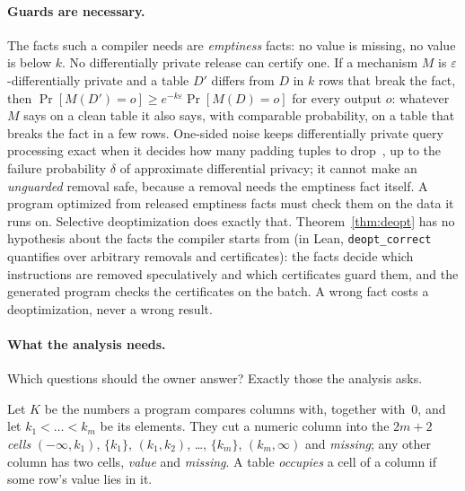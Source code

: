 \paragraph{Guards are necessary.} The facts such a compiler needs are \emph{emptiness} facts: no value
is missing, no value is below $k$. No differentially private release can certify one. If a mechanism
$M$ is $\varepsilon$-differentially private and a table $D'$ differs from $D$ in $k$ rows that break
the fact, then $\Pr[M(D') = o] \ge e^{-k\varepsilon}\Pr[M(D) = o]$ for every output $o$: whatever $M$
says on a clean table it also says, with comparable probability, on a table that breaks the fact in a
few rows. One-sided noise keeps differentially private query processing exact when it decides how
many padding tuples to drop~\cite{bater2018,wang2024special}, up to the failure probability $\delta$ of
approximate differential privacy; it cannot make an \emph{unguarded} removal safe, because a removal
needs the emptiness fact itself. A program optimized from released emptiness facts must check them on
the data it runs on. Selective deoptimization does exactly that. Theorem~\ref{thm:deopt} has no
hypothesis about the facts the compiler starts from (in Lean, \texttt{deopt\_correct} quantifies over
arbitrary removals and certificates): the facts decide which instructions are removed speculatively and
which certificates guard them, and the generated program checks the certificates on the batch. A
wrong fact costs a deoptimization, never a wrong result.

\paragraph{What the analysis needs.} Which questions should the owner answer? Exactly those the
analysis asks.

Let $K$ be the numbers a program compares columns with, together with~0, and let
$k_1 < \dots < k_m$ be its elements. They cut a numeric column into the $2m+2$ \emph{cells}
$(-\infty,k_1)$, $\{k_1\}$, $(k_1,k_2)$, \ldots, $\{k_m\}$, $(k_m,\infty)$ and \emph{missing}; any other
column has two cells, \emph{value} and \emph{missing}. A table \emph{occupies} a cell of a column if some
row's value lies in it.

